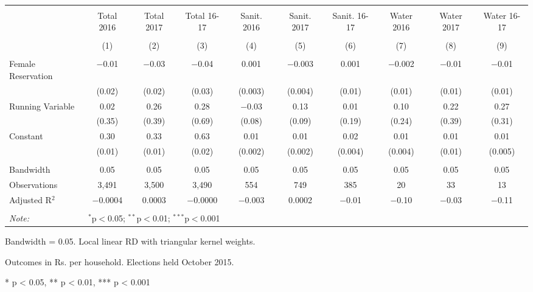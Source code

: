 \begin{table}
\centering
\begin{threeparttable}

  \caption{} 
  \label{} 
\scriptsize 
\begin{tabular}{@{\extracolsep{0pt}}lccccccccc} 
\\[-1.8ex]\hline 
\hline \\[-1.8ex] 
 & Total 2016 & Total 2017 & Total 16-17 & Sanit. 2016 & Sanit. 2017 & Sanit. 16-17 & Water 2016 & Water 2017 & Water 16-17 \\ 
\\[-1.8ex] & (1) & (2) & (3) & (4) & (5) & (6) & (7) & (8) & (9)\\ 
\hline \\[-1.8ex] 
 Female Reservation & $-$0.01 & $-$0.03 & $-$0.04 & 0.001 & $-$0.003 & 0.001 & $-$0.002 & $-$0.01 & $-$0.01 \\ 
  & (0.02) & (0.02) & (0.03) & (0.003) & (0.004) & (0.01) & (0.01) & (0.01) & (0.01) \\ 
  Running Variable & 0.02 & 0.26 & 0.28 & $-$0.03 & 0.13 & 0.01 & 0.10 & 0.22 & 0.27 \\ 
  & (0.35) & (0.39) & (0.69) & (0.08) & (0.09) & (0.19) & (0.24) & (0.39) & (0.31) \\ 
  Constant & 0.30 & 0.33 & 0.63 & 0.01 & 0.01 & 0.02 & 0.01 & 0.01 & 0.01 \\ 
  & (0.01) & (0.01) & (0.02) & (0.002) & (0.002) & (0.004) & (0.004) & (0.01) & (0.005) \\ 
 \hline \\[-1.8ex] 
Bandwidth & 0.05 & 0.05 & 0.05 & 0.05 & 0.05 & 0.05 & 0.05 & 0.05 & 0.05 \\ 
Observations & 3,491 & 3,500 & 3,490 & 554 & 749 & 385 & 20 & 33 & 13 \\ 
Adjusted R$^{2}$ & $-$0.0004 & 0.0003 & $-$0.0000 & $-$0.003 & 0.0002 & $-$0.01 & $-$0.10 & $-$0.03 & $-$0.11 \\ 
\hline 
\hline \\[-1.8ex] 
\textit{Note:}  & \multicolumn{9}{l}{$^{*}$p$<$0.05; $^{**}$p$<$0.01; $^{***}$p$<$0.001} \\ 
\end{tabular} 
\begin{tablenotes}[flushleft]
\setlength{\itemindent}{0em}
\scriptsize
\item[] Bandwidth = 0.05. Local linear RD with triangular kernel weights.
\item[] Outcomes in Rs. per household. Elections held October 2015.
\item[] * p < 0.05, ** p < 0.01, *** p < 0.001
\end{tablenotes}
\end{threeparttable}
\end{table}
